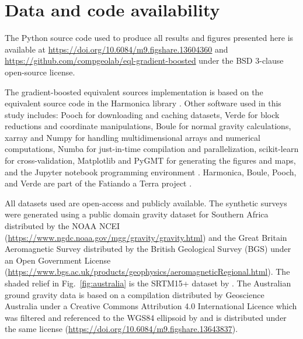 
\section{Data and code availability}

The Python source code used to produce all results and figures presented here
is available at
\url{https://doi.org/10.6084/m9.figshare.13604360} and
\url{https://github.com/compgeolab/eql-gradient-boosted}
under the BSD 3-clause open-source license.

The gradient-boosted equivalent sources implementation is based on the
equivalent source code in the Harmonica library \citep{harmonica2021}.
Other software used in this study includes:
Pooch \citep{pooch2020} for downloading and caching datasets,
Verde \citep{verde2018} for block reductions and coordinate manipulations,
Boule \citep{boule2020} for normal gravity calculations,
xarray \citep{xarray2017} and Numpy \citep{numpy2020} for handling
multidimensional arrays and numerical computations,
Numba \citep{numba2015} for just-in-time compilation and parallelization,
scikit-learn \citep{sklearn2011} for cross-validation,
Matplotlib \citep{matplotlib2007} and PyGMT \citep{pygmt2020} for generating
the figures and maps,
and the Jupyter notebook programming environment \citep{jupyter2016}.
Harmonica, Boule, Pooch, and Verde are part of the Fatiando a Terra project
\citep{fatiando2013}.

All datasets used are open-access and publicly available.
The synthetic surveys were generated using
a public domain gravity dataset for Southern Africa distributed by the
NOAA NCEI (\url{https://www.ngdc.noaa.gov/mgg/gravity/gravity.html})
and the Great Britain Aeromagnetic
Survey distributed by the
British Geological Survey (BGS) under an Open Government License
(\url{https://www.bgs.ac.uk/products/geophysics/aeromagneticRegional.html}).
The shaded relief in Fig.~\ref{fig:australia} is the SRTM15+ dataset by
\citet{tozer2019}.
The Australian ground gravity
data is based on a compilation distributed by Geoscience Australia under a
Creative Commons Attribution 4.0 International Licence \citep{wynne2018}  which
was filtered and referenced to the WGS84 ellipsoid by
\citet{australia_compilation} and is distributed under the same license
(\url{https://doi.org/10.6084/m9.figshare.13643837}).



